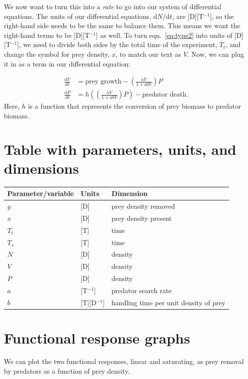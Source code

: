 \documentclass[11pt]{article}
\begin{document}
We now want to turn this into a \emph{rate} to go into our system of differential equations. The units of our differential equations, d$N/$d$t$,  are [D][T$^{-1}$], so the right-hand side needs to be the same to balance them. This means we want the right-hand terms to be [D][T$^{-1}$] as well. To turn eqn.~\ref{eq:type2} into units of [D][T$^{-1}$], we need to divide both sides by the total time of the experiment, $T_t$, and change the symbol for prey density, $x$, to match our text as $V$. Now, we can plug it in as a term in our differential equation:

\begin{equation}
\begin{aligned}
    \frac{\mathrm{d}V}{\mathrm{d}t} &= \text{prey growth} - \left(\frac{aV}{1 + abV}\right)P \\
    \frac{\mathrm{d}P}{\mathrm{d}t} &=  h\left(\left(\frac{aV}{1 + abV}\right)P\right) - \text{predator death}.
\end{aligned}
\end{equation}
Here, $h$ is a function that represents the conversion of prey biomass to predator biomass.

\section{Table with parameters, units, and dimensions}
    \begin{tabular}{l l l}
    \hline
    Parameter/variable & Units & Dimension \\
    \hline
    $y$ & [D] & prey density removed \\
    $x$ & [D] & prey density present \\
    $T_t$ & [T] & time \\
    $T_s$ & [T] & time \\
    $N$ & [D] & density \\
    $V$ & [D] & density \\
    $P$ & [D] & density \\
    $a$ & [T$^{-1}$] & predator search rate \\
    $b$ & [T][D$^{-1}$] & handling time per unit density of prey\\
    \hline
    \end{tabular}

\section{Functional response graphs}
We can plot the two functional responses, linear and saturating, as prey removal by predators as a function of prey density.
\end{document}
